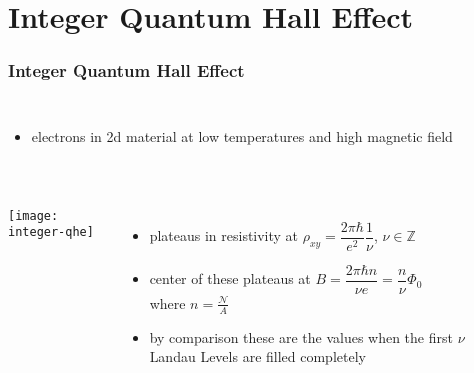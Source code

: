 \section{Integer Quantum Hall Effect}
\begin{frame}
\frametitle{Integer Quantum Hall Effect}
	\begin{columns}
		\column[]{12cm}
		\begin{itemize}
			\item electrons in 2d material at low temperatures and high magnetic field\\\ \\
		\end{itemize}
	\end{columns}

	\begin{columns}
	\column[]{6cm}
	\texttt{[image: integer-qhe]}
	
	\column[]{6cm}
	\begin{itemize}
	
		\item \alert{plateaus} in resistivity at $\rho_{xy} = \dfrac{2\pi\hbar}{e^2} \dfrac{1}{\nu}$, \quad $\nu \in \mathbb{Z}$
		
		\item center of these plateaus at $B = \dfrac{2\pi\hbar n}{\nu e} = \dfrac{n}{\nu}\Phi_0$\\
		where $n = \frac{\mathcal{N}}{A}$
		
		\item by comparison these are the values when the first $\nu$ Landau Levels are filled completely

	\end{itemize}
	\end{columns}
\end{frame}


